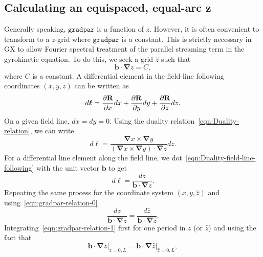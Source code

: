 \documentclass{jpp}
\newcommand{\GX}{{GX}\xspace}
\renewcommand{\vec}[1]{\ensuremath{\mbox{$ {\bf #1} $}}} %
\begin{document}
\subsection{Calculating an equispaced, equal-arc z} \label{eqarc}
Generally speaking, $\texttt{gradpar}$ is a function of $z$. However, it is often convenient to transform to a $z$-grid where $\texttt{gradpar}$ is a constant. This is strictly necessary in \GX to allow Fourier spectral treatment of the parallel streaming term in the gyrokinetic equation. To do this, we seek a grid $\hat{z}$ such that
\begin{equation}
    \boldsymbol{b}\cdot \boldsymbol{\nabla} \hat{z} = C,
\end{equation}
where $C$ is a constant. A differential element in the field-line following coordinates $(x, y, z)$ can be written as
\begin{equation}
    d\boldsymbol{\ell} = \pderiv{\vec{R}}{x}dx + \pderiv{\vec{R}}{y}dy + \pderiv{\vec{R}}{z}dz.
\end{equation}
On a given field line, $dx = dy = 0$. Using the duality relation~\eqref{eqn:Duality-relation}, we can write
\begin{equation}
    d\boldsymbol{\ell} = \frac{\boldsymbol{\nabla}x\times \boldsymbol{\nabla}y}{(\boldsymbol{\nabla}x\times \boldsymbol{\nabla}y)\cdot\boldsymbol{\nabla}z} dz.
    \label{eqn:Duality-field-line-following}
\end{equation}
For a differential line element along the field line, we dot~\eqref{eqn:Duality-field-line-following} with the unit vector $\boldsymbol{b}$ to get
\begin{equation}
    {d\ell} =  \frac{dz}{\boldsymbol{b}\cdot \boldsymbol{\nabla}z}.
\label{eqn:gradpar-relation-0}
\end{equation}
Repeating the same process for the coordinate system $(x, y, \hat{z})$ and using~\eqref{eqn:gradpar-relation-0}
\begin{equation}
    \frac{dz}{\boldsymbol{b}\cdot \boldsymbol{\nabla}z} =  \frac{d\hat{z}}{\boldsymbol{b}\cdot \boldsymbol{\nabla}\hat{z}}.
\label{eqn:gradpar-relation-1}
\end{equation}
Integrating~\eqref{eqn:gradpar-relation-1} first for one period in $z$ (or $\hat{z}$) and using the fact that
\begin{equation}
    \boldsymbol{b}\cdot\boldsymbol{\nabla}z \lvert_{z = 0, L} = \boldsymbol{b}\cdot\boldsymbol{\nabla}{\hat{z}} \lvert_{\hat{z} = 0, L},
\end{equation}
\end{document}
